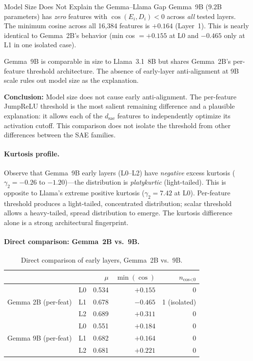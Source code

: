 \documentclass[11pt,a4paper]{article}
\newcommand{\cosED}{\cos(E_i, D_i)}
\begin{document}
\begin{finding}{Model Size Does Not Explain the Gemma--Llama Gap}
Gemma~9B ($9.2$B parameters) has \emph{zero} features with $\cosED < 0$ across \emph{all} tested layers. The minimum cosine across all 16,384 features is $+0.164$ (Layer~1). This is nearly identical to Gemma~2B's behavior (min cos $= +0.155$ at L0 and $-0.465$ only at L1 in one isolated case).

Gemma~9B is comparable in size to Llama~3.1~8B but shares Gemma~2B's per-feature threshold architecture. The absence of early-layer anti-alignment at 9B scale rules out model size as the explanation.

\textbf{Conclusion:} Model size does not cause early anti-alignment. The per-feature JumpReLU threshold is the most salient remaining difference and a plausible explanation: it allows each of the $d_\text{sae}$ features to independently optimize its activation cutoff. This comparison does not isolate the threshold from other differences between the SAE families.
\end{finding}

\paragraph{Kurtosis profile.} Observe that Gemma~9B early layers (L0--L2) have \emph{negative} excess kurtosis ($\gamma_2 = -0.26$ to $-1.20$)---the distribution is \emph{platykurtic} (light-tailed). This is opposite to Llama's extreme positive kurtosis ($\gamma_2 = 7.42$ at L0). Per-feature threshold produces a light-tailed, concentrated distribution; scalar threshold allows a heavy-tailed, spread distribution to emerge. The kurtosis diffierence alone is a strong architectural fingerprint.

\paragraph{Direct comparison: Gemma~2B vs.\ 9B.}
\begin{table}[H]
\centering
\small
\caption{Direct comparison of early layers, Gemma~2B vs.\ 9B.}
\begin{tabular}{@{}llrrr@{}}
\toprule
& & $\mu$ & $\min(\cos)$ & $n_\text{cos<0}$ \\
\midrule
\multirow{3}{*}{Gemma 2B (per-feat)} & L0 & 0.534 & $+0.155$ & 0 \\
 & L1 & 0.678 & $-0.465$ & 1 (isolated) \\
 & L2 & 0.689 & $+0.311$ & 0 \\
\midrule
\multirow{3}{*}{Gemma 9B (per-feat)} & L0 & 0.551 & $+0.184$ & 0 \\
 & L1 & 0.682 & $+0.164$ & 0 \\
 & L2 & 0.681 & $+0.221$ & 0 \\
\bottomrule
\end{tabular}
\end{table}
\end{document}
